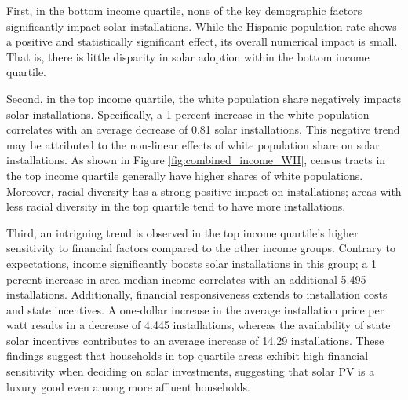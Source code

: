 \documentclass[12pt,twoside,letterpaper]{article}
\begin{document}
First, in the bottom income quartile, none of the key demographic factors significantly impact solar installations. While the Hispanic population rate shows a positive and statistically significant effect, its overall numerical impact is small. That is, there is little disparity in solar adoption within the bottom income quartile. 

Second, in the top income quartile, the white population share negatively impacts solar installations. Specifically, a 1 percent increase in the white population correlates with an average decrease of 0.81 solar installations. This negative trend may be attributed to the non-linear effects of white population share on solar installations. As shown in Figure \ref{fig:combined_income_WH}, census tracts in the top income quartile generally have higher shares of white populations. Moreover, racial diversity has a strong positive impact on installations; areas with less racial diversity in the top quartile tend to have more installations.

Third, an intriguing trend is observed in the top income quartile’s higher sensitivity to financial factors compared to the other income groups. Contrary to expectations, income significantly boosts solar installations in this group; a 1 percent increase in area median income correlates with an additional 5.495 installations. Additionally, financial responsiveness extends to installation costs and state incentives. A one-dollar increase in the average installation price per watt results in a decrease of 4.445 installations, whereas the availability of state solar incentives contributes to an average increase of 14.29 installations. These findings suggest that households in top quartile areas exhibit high financial sensitivity when deciding on solar investments, suggesting that solar PV is a luxury good even among more affluent households.


\end{document}
